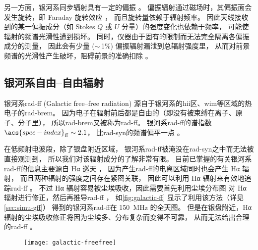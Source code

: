 另一方面，银河系同步辐射具有一定的偏振 \cite{bernardi2009,jelic2014,gehlot2018}。
偏振辐射通过磁场时，其偏振面会发生旋转，即 Faraday 旋转效应 \cite{rybicki1979}，
而且旋转量依赖于辐射频率。
因此天线接收到的某一偏振成分（如 Stokes $Q$ 或 $U$ 分量）的强度变化也依赖于频率，
可能使辐射的频谱光滑性遭到损坏。
同时，仪器由于固有的限制而无法完全隔离各偏振成分的测量，
因此会有少量 ($\sim$\,1\%) 偏振辐射漏泄到总辐射强度里，
从而对前景频谱的光滑性产生破坏，阻碍前景的准确扣除
\cite{jelic2010,alonso2014,nunhokee2017,gehlot2018,spinelli2018}。

\subsection{银河系自由--自由辐射}

银河系\acs{rad-ff} (Galactic free--free radiation)
源自于银河系的\ac{hii}区、\ac{wim}等区域的热电子的\ac{rad-brem}。
因为电子在辐射前后都是自由的（即没有被束缚在离子、原子、分子里），
所以\ac{rad-brem}又被称为\ac{rad-ff}。
银河系\ac{rad-ff}的谱指数 $\acs{spec-index}_{\R{ff}} \sim 2.1$，
比\ac{rad-syn}的频谱偏平一点 \cite{dickinson2003}。

在低频射电波段，除了银盘附近区域，
银河系\ac{rad-ff}被淹没在\ac{rad-syn}之中而无法被直接观测到，
所以我们对该辐射成分的了解非常有限。
目前已掌握的有关银河系\ac{rad-ff}的信息主要源自 Hα 巡天 \cite{finkbeiner2003}，
因为产生\ac{rad-ff}的电离区域同时也会产生 Hα 辐射，
而且两种辐射的强度之间存在紧密关联，
因此可以利用 Hα 辐射来有效地追踪\ac{rad-ff} \cite{smoot1998,dickinson2003}。
不过 Hα 辐射容易被尘埃吸收，因此需要首先利用尘埃分布图\cite{schlegel1998}
对 Hα 辐射进行修正，然后再推导\ac{rad-ff} \cite{dickinson2003}，
如\autoref{fig:galactic-ff} 显示了利用该方法（详见 \autoref{sec:simu-gff}）
得到的银河系\ac{rad-ff}在 \SI{150}{\MHz} 的全天图。
但是在银盘附近，Hα 辐射的尘埃吸收修正将因为尘埃多、分布复杂而变得不可靠，
从而无法给出合理的\ac{rad-ff} \cite{dickinson2003}。

\begin{figure}[htp]
  \centering
  \texttt{[image: galactic-freefree]}
  \label{fig:galactic-ff}
\end{figure}


